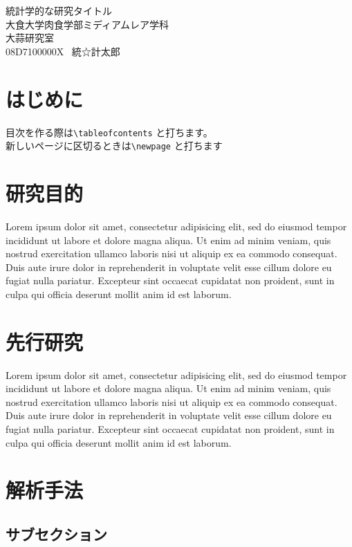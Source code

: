\documentclass[a4j,10.5pt]{jarticle}
\begin{document}
\begin{center}
\thispagestyle{empty}
\vspace*{3.5cm}
{\Huge 統計学的な研究タイトル}\\
\vspace*{12.5cm}
{\Large 大食大学肉食学部ミディアムレア学科}\\
{\Large 大蒜研究室}\\
{\Large 08D7100000X \ 統☆計太郎}
\end{center}
\newpage
{}
\tableofcontents
\newpage
{}
\section{はじめに}
目次を作る際は\verb+\tableofcontents+ と打ちます。\\
新しいページに区切るときは\verb+\newpage+ と打ちます
\section{研究目的}
Lorem ipsum dolor sit amet, consectetur adipisicing elit, sed do eiusmod tempor incididunt ut labore et dolore magna aliqua. Ut enim ad minim veniam, quis nostrud exercitation ullamco laboris nisi ut aliquip ex ea commodo consequat. Duis aute irure dolor in reprehenderit in voluptate velit esse cillum dolore eu fugiat nulla pariatur. Excepteur sint occaecat cupidatat non proident, sunt in culpa qui officia deserunt mollit anim id est laborum.

\section{先行研究}
Lorem ipsum dolor sit amet, consectetur adipisicing elit, sed do eiusmod tempor incididunt ut labore et dolore magna aliqua. Ut enim ad minim veniam, quis nostrud exercitation ullamco laboris nisi ut aliquip ex ea commodo consequat. Duis aute irure dolor in reprehenderit in voluptate velit esse cillum dolore eu fugiat nulla pariatur. Excepteur sint occaecat cupidatat non proident, sunt in culpa qui officia deserunt mollit anim id est laborum.

\section{解析手法}
\subsection{サブセクション}
\end{document}

